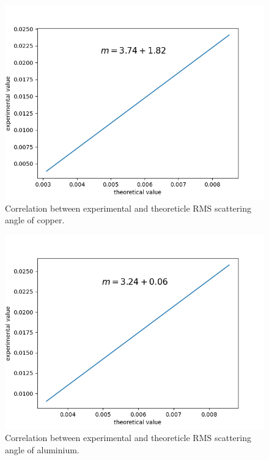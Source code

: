 \documentclass[sn-mathphys-num,iicol]{sn-jnl}
\theoremstyle{thmstyleone}
\theoremstyle{thmstyletwo}
\theoremstyle{thmstylethree}
\begin{document}
\begin{figure}
  \includegraphics[width=0.9\linewidth]{../src/elsa/finished_plots/Copper.png}
  \caption{Correlation between experimental and theoreticle RMS scattering angle of copper.}
  \label{fig:correlation_cop}  
\end{figure}

\begin{figure}
  \includegraphics[width=0.9\linewidth]{../src/elsa/finished_plots/Aluminium.png}
  \caption{Correlation between experimental and theoreticle RMS scattering angle of aluminium.}
  \label{fig:correlation_alu}  
\end{figure}
\end{document}

